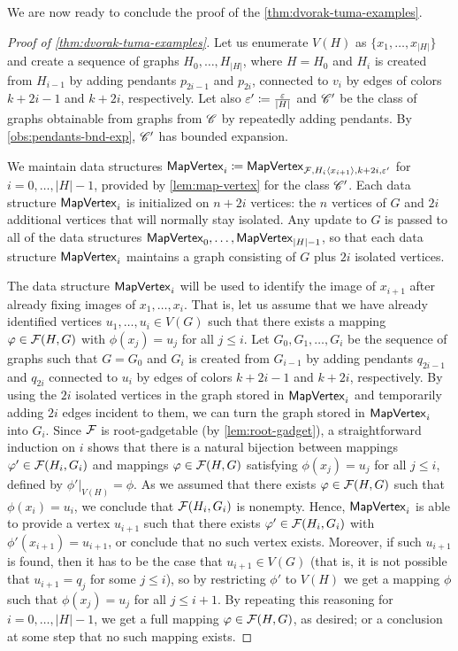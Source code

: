 We are now ready to conclude the proof of the \cref{thm:dvorak-tuma-examples}.

\begin{proof} [Proof of \cref{thm:dvorak-tuma-examples}]
	Let us enumerate $V(H)$ as $\{x_1, \ldots, x_{|H|}\}$ and create a sequence of graphs $H_0, \ldots, H_{|H|}$, where $H=H_0$ and $H_{i}$ is created from $H_{i-1}$ by adding pendants $p_{2i-1}$ and $p_{2i}$, connected to $v_i$ by edges of colors $k+2i-1$ and $k+2i$, respectively. Let also $\varepsilon'\coloneqq \tfrac{\varepsilon}{|H|}$ and $\mathscr C'$ be the class of graphs obtainable from graphs from $\mathscr C$ by repeatedly adding pendants. By \cref{obs:pendants-bnd-exp}, $\mathscr C'$ has bounded expansion.
	
	We maintain data structures $\mathsf{MapVertex}_i \coloneqq \mathsf{MapVertex}_{\mathcal{F}, H_i\langle x_{i+1}\rangle, k + 2i,\varepsilon'}$ for $i=0, \ldots, |H|-1$, provided by \cref{lem:map-vertex} for the class $\mathscr C'$. Each data structure $\mathsf{MapVertex}_i$ is initialized on $n+2i$ vertices: the $n$ vertices of $G$ and $2i$ additional vertices that will normally stay isolated. Any update to $G$ is passed to all of the data structures $\mathsf{MapVertex}_0, \ldots, \mathsf{MapVertex}_{|H|-1}$, so that each data structure $\mathsf{MapVertex}_i$ maintains a graph consisting of $G$ plus $2i$ isolated vertices. 
	
	The data structure $\mathsf{MapVertex}_i$ will be used to identify the image of $x_{i+1}$ after already fixing images of $x_1, \ldots, x_i$.
	That is, let us assume that we have already identified vertices $u_1, \ldots, u_i \in V(G)$ such that there exists a mapping $\varphi \in \mathcal{F}(H, G)$ with $\phi(x_j)=u_j$ for all $j \le i$. Let $G_0, G_1, \ldots, G_i$ be the sequence of graphs such that $G=G_0$ and $G_i$ is created from $G_{i-1}$ by adding pendants $q_{2i-1}$ and $q_{2i}$ connected to $u_i$ by edges of  colors $k+2i-1$ and $k+2i$, respectively. By using the $2i$ isolated vertices in the graph stored in $\mathsf{MapVertex}_i$ and temporarily adding $2i$ edges incident to them, we can turn the graph stored in $\mathsf{MapVertex}_i$ into $G_i$. Since $\mathcal{F}$ is root-gadgetable (by \cref{lem:root-gadget}), a straightforward induction on $i$ shows that there is a natural bijection between mappings $\varphi' \in \mathcal{F}(H_i, G_i)$ and mappings $\varphi \in \mathcal{F}(H, G)$ satisfying $\phi(x_j)=u_j$ for all $j\leq i$, defined by $\phi'|_{V(H)} = \phi$. As we assumed that there exists $\varphi \in \mathcal{F}(H, G)$ such that $\phi(x_i) = u_i$, we conclude that $\mathcal{F}(H_i, G_i)$ is nonempty. Hence, $\mathsf{MapVertex}_i$ is able to provide a vertex $u_{i+1}$ such that there exists $\varphi' \in \mathcal{F}(H_i, G_i)$ with $\phi'(x_{i+1})=u_{i+1}$, or conclude that no such vertex exists. Moreover, if such $u_{i+1}$ is found, then it has to be the case that $u_{i+1} \in V(G)$ (that is, it is not possible that $u_{i+1}=q_j$ for some $j\le i$), so by restricting $\phi'$ to $V(H)$ we get a mapping $\phi$ such that $\phi(x_j)=u_j$ for all $j\le i+1$. By repeating this reasoning for $i=0, \ldots, |H|-1$, we get a full mapping $\varphi \in \mathcal{F}(H, G)$, as desired; or a conclusion at some step that no such mapping exists.
	

\end{proof}
